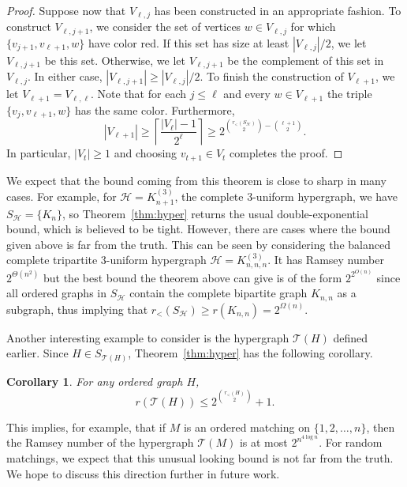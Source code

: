 \documentclass[11pt]{article}
\newtheorem{corollary}[theorem]{Corollary}
\newcommand{\rord}{r_{<}}
\begin{document}
\begin{proof}
Suppose now that $V_{\ell, j}$ has been constructed in an appropriate fashion. To construct $V_{\ell, j+1}$, we consider the set of vertices $w \in V_{\ell,j}$ for which $\{v_{j+1}, v_{\ell+1}, w\}$
have color red. If this set has size at least $|V_{\ell, j}|/2$, we let $V_{\ell, j+1}$ be this set. Otherwise, we let $V_{\ell, j+1}$ be the complement of this set in $V_{\ell, j}$. In either case, $|V_{\ell, j+1}| \geq |V_{\ell, j}|/2$. To finish the construction of $V_{\ell + 1}$, we let $V_{\ell + 1} = V_{\ell, \ell}$. Note that for each $j \le \ell$ and every $w \in V_{\ell + 1}$ the triple $\{v_j, v_{\ell + 1}, w\}$ has the same color. Furthermore,
\[|V_{\ell + 1}| \geq \left\lceil \frac{|V_{\ell}|-1}{2^{\ell}} \right\rceil \geq 2^{\binom{\rord(S_\mathcal{H})}{2} - \binom{\ell + 1}{2}}.\]
In particular, $|V_t| \geq 1$ and choosing $v_{t+1} \in V_t$ completes the proof.
\end{proof}

We expect that the bound coming from this theorem is close to sharp in many cases. For example, for $\mathcal{H} = K_{n+1}^{(3)}$, the complete $3$-uniform hypergraph, we have $S_{\mathcal{H}} = \{K_n\}$, so Theorem~\ref{thm:hyper} returns the usual double-exponential bound, which is believed to be tight.  However, there are cases where the bound given above is far from the truth. This can be seen by considering the balanced complete tripartite $3$-uniform hypergraph $\mathcal{H}=K^{(3)}_{n,n,n}$. 
It has Ramsey number $2^{\Theta(n^2)}$ but the best bound the theorem above can give is
of the form $2^{2^{O(n)}}$ since all ordered graphs in $S_{\mathcal{H}}$ contain
the complete bipartite graph $K_{n,n}$ as a subgraph, thus implying that
$r_<(S_\mathcal{H}) \ge r(K_{n,n}) = 2^{\Omega(n)}$.

Another interesting example to consider is the hypergraph $\mathcal{T}(H)$ defined earlier. Since $H \in S_{\mathcal{T}(H)}$, Theorem~\ref{thm:hyper} has the following corollary.

\begin{corollary}
For any ordered graph $H$,
\[r(\mathcal{T}(H)) \leq 2^{\binom{r_<(H)}{2}} + 1.\]
\end{corollary}

This implies, for example, that if $M$ is an ordered matching on $\{1, 2, \dots, n\}$, then the Ramsey number of the hypergraph $\mathcal{T}(M)$ is at most $2^{n^{4 \log n}}$. For random matchings, we expect that this unusual looking bound is not far from the truth. We hope to discuss this direction further in future work.
\end{document}
